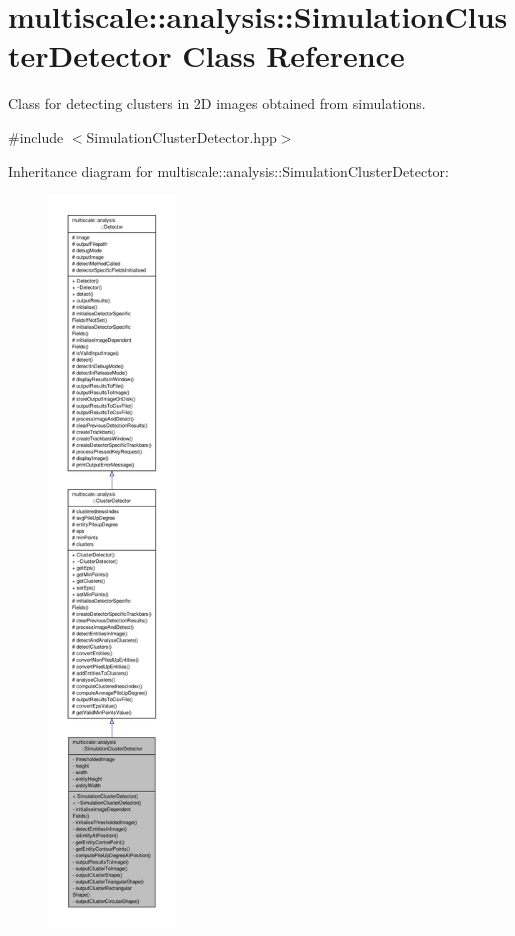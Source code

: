 \hypertarget{classmultiscale_1_1analysis_1_1SimulationClusterDetector}{\section{multiscale\-:\-:analysis\-:\-:Simulation\-Cluster\-Detector Class Reference}
\label{classmultiscale_1_1analysis_1_1SimulationClusterDetector}
}


Class for detecting clusters in 2\-D images obtained from simulations.  




{\ttfamily \#include $<$Simulation\-Cluster\-Detector.\-hpp$>$}



Inheritance diagram for multiscale\-:\-:analysis\-:\-:Simulation\-Cluster\-Detector\-:\nopagebreak
\begin{figure}[H]
\begin{center}
\leavevmode
\includegraphics[height=550pt]{classmultiscale_1_1analysis_1_1SimulationClusterDetector__inherit__graph}
\end{center}
\end{figure}


